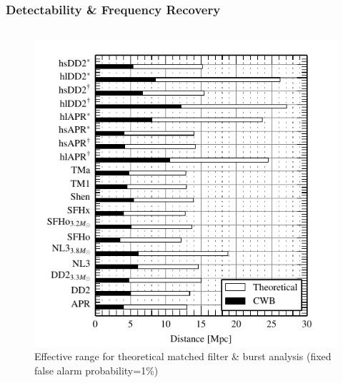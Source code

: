 \documentclass[serif,mathserif,10pt]{beamer}
\let\oldframetitle\frametitle%
\renewcommand{\frametitle}[1]{%
      \oldframetitle{#1}\setstretch{1.2}}
\begin{document}
\begin{frame}
    \frametitle{Detectability \& Frequency Recovery}

    \begin{columns}[]


        \begin{center}
            \vspace{-0.08cm}
            \begin{figure}
                \includegraphics[width=1\columnwidth]{figures/distances.pdf}
                \caption{Effective range for theoretical matched
                    filter \& burst analysis (fixed false alarm
                    probability=1\%)}
            \end{figure}
        \end{center}



\end{columns}
\end{frame}
\end{document}
